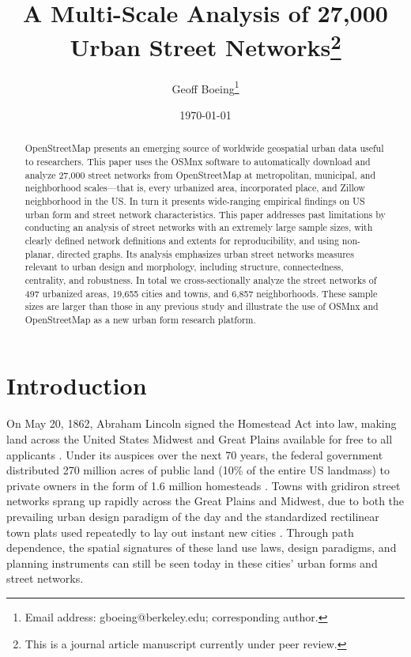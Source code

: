 \documentclass{article}
\begin{document}
\title{A Multi-Scale Analysis of 27,000 Urban Street Networks\footnote{This is a journal article manuscript currently under peer review.}}
\author{Geoff Boeing\footnote{Email address: gboeing@berkeley.edu; corresponding author.}}
\date{\today}
\maketitle

\begin{abstract}
OpenStreetMap presents an emerging source of worldwide geospatial urban data useful to researchers. This paper uses the OSMnx software to automatically download and analyze 27,000 street networks from OpenStreetMap at metropolitan, municipal, and neighborhood scales---that is, every urbanized area, incorporated place, and Zillow neighborhood in the US. In turn it presents wide-ranging empirical findings on US urban form and street network characteristics. This paper addresses past limitations by conducting an analysis of street networks with an extremely large sample sizes, with clearly defined network definitions and extents for reproducibility, and using non-planar, directed graphs. Its analysis emphasizes urban street networks measures relevant to urban design and morphology, including structure, connectedness, centrality, and robustness. In total we cross-sectionally analyze the street networks of 497 urbanized areas, 19,655 cities and towns, and 6,857 neighborhoods. These sample sizes are larger than those in any previous study and illustrate the use of OSMnx and OpenStreetMap as a new urban form research platform.
\end{abstract}

\section{Introduction}
On May 20, 1862, Abraham Lincoln signed the Homestead Act into law, making land across the United States Midwest and Great Plains available for free to all applicants \cite{porterfield_homestead_2005}. Under its auspices over the next 70 years, the federal government distributed 270 million acres of public land (10\% of the entire US landmass) to private owners in the form of 1.6 million homesteads \cite{lee_kansas_1979, sherraden_inclusion_2005}. Towns with gridiron street networks sprang up rapidly across the Great Plains and Midwest, due to both the prevailing urban design paradigm of the day and the standardized rectilinear town plats used repeatedly to lay out instant new cities \cite{southworth_streets_1997}. Through path dependence, the spatial signatures of these land use laws, design paradigms, and planning instruments can still be seen today in these cities' urban forms and street networks.
\end{document}
